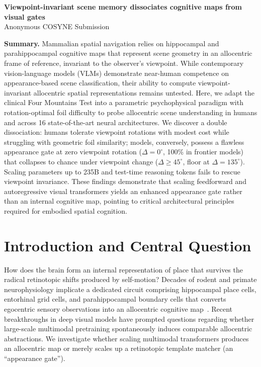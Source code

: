 \documentclass[12pt,letterpaper]{article}
\begin{document}
\begin{center}
  {\bfseries\Large Viewpoint-invariant scene memory dissociates cognitive maps from visual gates}\\[4pt]
  {\small Anonymous COSYNE Submission}
\end{center}

\vspace{-4pt}
\textbf{Summary.}
Mammalian spatial navigation relies on hippocampal and parahippocampal cognitive maps that represent scene geometry in an allocentric frame of reference, invariant to the observer's viewpoint.
While contemporary vision-language models (VLMs) demonstrate near-human competence on appearance-based scene classification, their ability to compute viewpoint-invariant allocentric spatial representations remains untested.
Here, we adapt the clinical Four Mountains Test into a parametric psychophysical paradigm with rotation-optimal foil difficulty to probe allocentric scene understanding in humans and across 16 state-of-the-art neural architectures.
We discover a double dissociation: humans tolerate viewpoint rotations with modest cost while struggling with geometric foil similarity; models, conversely, possess a flawless appearance gate at zero viewpoint rotation ($\Delta=0^\circ$, 100\% in frontier models) that collapses to chance under viewpoint change ($\Delta \ge 45^\circ$, floor at $\Delta=135^\circ$).
Scaling parameters up to 235B and test-time reasoning tokens fails to rescue viewpoint invariance.
These findings demonstrate that scaling feedforward and autoregressive visual transformers yields an enhanced appearance gate rather than an internal cognitive map, pointing to critical architectural principles required for embodied spatial cognition.

\section{Introduction and Central Question}
How does the brain form an internal representation of place that survives the radical retinotopic shifts produced by self-motion?
Decades of rodent and primate neurophysiology implicate a dedicated circuit comprising hippocampal place cells, entorhinal grid cells, and parahippocampal boundary cells that converts egocentric sensory observations into an allocentric cognitive map~\citep{ohara2011fourmountains,hartley2007hippocampal}.
Recent breakthroughs in deep visual models have prompted questions regarding whether large-scale multimodal pretraining spontaneously induces comparable allocentric abstractions.
We investigate whether scaling multimodal transformers produces an allocentric map or merely scales up a retinotopic template matcher (an ``appearance gate'').
\end{document}
